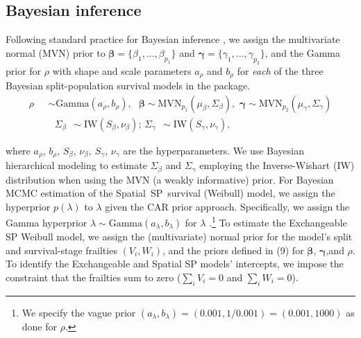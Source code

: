 \subsection{Bayesian inference}

Following standard practice for Bayesian inference \citep{carlin2000}, we assign the multivariate normal (MVN) prior to $\boldsymbol{\beta
}=\{\beta_{1},...,\beta_{p_{1}}\}$ and $\boldsymbol{\gamma}=\{\gamma
_{1},...,\gamma_{p_{2}}\}$, and the Gamma prior for $\rho$ with shape and
scale parameters $a_{\rho}$ and $b_{\rho}$ for \emph{each} of the three Bayesian
split-population survival models in the  package.
\begin{equation}
\begin{split} 
\rho\text{ } &  \sim\text{Gamma}\left(a_{\rho},b_{\rho}\right),\text{ \ \ \ }%
\boldsymbol{\beta}\sim\mbox{MVN}_{p_{1}}\left(\mu_{\beta},\Sigma_{\beta}\right),\text{
\ \ \ }\boldsymbol{\gamma}\sim\mbox{MVN}_{p_{2}} \left(\mu_{\gamma},\Sigma_{\gamma
}\right)\\
&  \text{ \ \ \ \ \ \ \ \ \ \ \ \ \ \ \ \ \ \ }\Sigma
_{\beta\text{ }}\sim\text{IW}\left(S_{\beta},\nu_{\beta}\right)\text{;\ \ }\Sigma
_{\gamma\text{ }}\sim\text{IW}\left(S_{\gamma},\nu_{\gamma}\right),
\end{split}
\end{equation}


\noindent where $a_{\rho}$, $b_{\rho}$, $S_{\beta}$, $\nu_{\beta},\ S_{\gamma
}$, $\nu_{\gamma}$ are the hyperparameters. We use Bayesian
hierarchical modeling to estimate $\Sigma_{\beta}$ and $\Sigma_{\gamma}$
employing the Inverse-Wishart ($\mbox{IW}$) distribution when using the MVN (a
weakly informative) prior. For Bayesian MCMC estimation of the
Spatial\ SP\ survival (Weibull) model, we assign the hyperprior $p(\lambda)$ to
$\lambda$ given the CAR prior approach. Specifically, we assign
the Gamma hyperprior $\lambda\sim\mbox{Gamma}(a_{\lambda},b_{\lambda})$ for
$\lambda$ \citep{banerjee2004parametric,darmofal2009bayesian}.\footnote{We specify the vague prior
$\left(a_{\lambda},b_{\lambda}\right)=\left(0.001,1/0.001\right)=\left(0.001,1000\right)$ as done for $\rho$.}
To estimate the Exchangeable SP Weibull model, we assign the (multivariate) normal prior for
the model's split and survival-stage frailties $\left(V_{i},W_{i}\right)$, and the priors defined in (9) for $\boldsymbol{\beta}$, $\boldsymbol{\gamma}$,and $\rho$. To identify the Exchangeable and Spatial SP models'
intercepts, we impose the constraint that the frailties sum to zero ($\sum_{i}V_{i}=0$ and $\sum_{i}W_{i}=0$).

